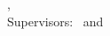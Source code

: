 \AddToShipoutPicture*{\TitleWatermark}%
\hfill
\vfill
{
	\small
	\textbf{\thesisName} \\
	\textit{\thesisTitle} \\
	\thesisSubject, \thesisDate \\
	Supervisors: \thesisExternalSupervisor\ and \thesisInternalSupervisor \\[1.5em]
	\textbf{\thesisUniversity} \\
	\textit{\thesisFaculty} \\
	\thesisInstitute \\
	\thesisAddress \\
	\thesisPostal\ \thesisCity
}
